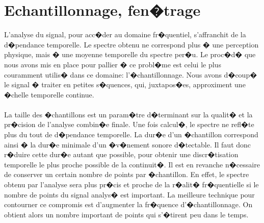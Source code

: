 	\section{Echantillonnage, fen�trage}
        	L'analyse du signal, pour acc�der au domaine fr�quentiel, s'affranchit de la d�pendance temporelle.  Le spectre 
		obtenu ne correspond plus � une perception physique, mais � une moyenne temporelle du spectre per�u. Le proc�d� 
		que nous avons mis en place pour pallier � ce probl�me est celui le plus couramment utilis� dans ce domaine: 
		l'�chantillonnage. Nous avons d�coup� le signal � traiter en petites s�quences, qui, juxtapos�es, approximent une �chelle temporelle continue.
\paragraph{}
La taille des �chantillons est un param�tre d�terminant sur la qualit� et la pr�cision de l'analyse combin�e finale. 
	Une fois calcul�, le spectre ne refl�te plus du tout de d�pendance temporelle. La dur�e d'un �chantillon correspond 
	ainsi � la dur�e minimale d'un �v�nement sonore d�tectable. Il faut donc r�duire cette dur�e autant que possible, 
	pour obtenir une discr�tisation temporelle le plus proche possible de la continuit�. Il est en revanche n�cessaire 
	de conserver un certain nombre de points par �chantillon. En effet, le spectre obtenu par l'analyse sera plus pr�cis 
	et proche de la r�alit� fr�quentielle si le nombre de points du signal analys� est important. La meilleure technique 
	pour contourner ce compromis est d'augmenter la fr�quence d'�chantillonnage. 
	On obtient alors un nombre important de points qui s'�tirent peu dans le temps.
